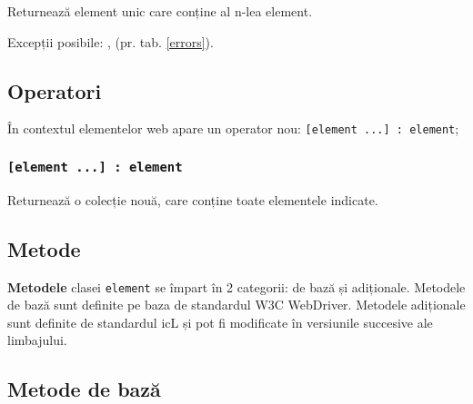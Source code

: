 Returnează element unic care conține al n-lea element.

Excepții posibile: ,  (pr. tab. \ref{errors}).

\subsection{Operatori}

În contextul elementelor web apare un operator nou: \texttt{[element ...] : element};

\subsubsection{\texttt{[element ...] : element}}

Returnează o colecție nouă, care conține toate elementele indicate.

\subsection{Metode}

{\bf Metodele} clasei \texttt{element} se împart în 2 categorii: de bază și adiționale. Metodele de bază sunt definite pe baza de standardul W3C WebDriver. Metodele adiționale sunt definite de standardul icL și pot fi modificate în versiunile succesive ale limbajului.

\subsection{Metode de bază}

